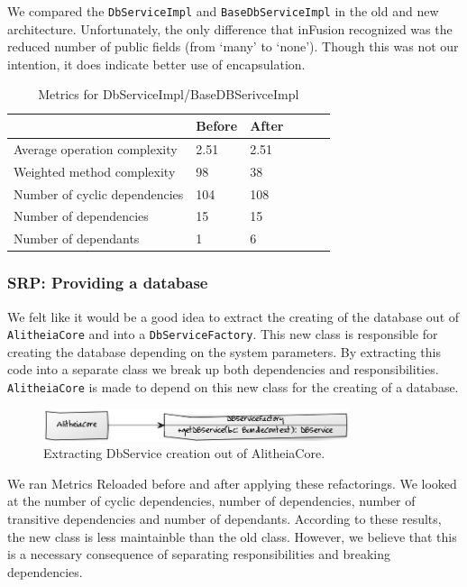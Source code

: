\documentclass{article}
\begin{document}
We compared the \verb|DbServiceImpl| and \verb|BaseDbServiceImpl| in the old and new architecture. Unfortunately, the only difference that inFusion recognized was the reduced number of public fields (from `many' to `none'). Though this was not our intention, it does indicate better use of encapsulation.


\begin{table}[h]
	\centering
    \begin{tabular}{l|llll}
    ~                                 & Before & After & ~ & ~ \\ \hline
    Average operation complexity      & 2.51 & 2.51 \\
    Weighted method complexity        & 98   & 38 \\
    Number of cyclic dependencies     & 104  & 108 \\
    Number of dependencies            & 15   & 15  \\
    Number of dependants              & 1    & 6   \\
    \end{tabular}
    \caption{Metrics for DbServiceImpl/BaseDBSerivceImpl}
\end{table}

\subsubsection{SRP: Providing a database}
We felt like it would be a good idea to extract the creating of the database out of \verb|AlitheiaCore| and into a \verb|DbServiceFactory|. This new class is responsible for creating the database depending on the system parameters. By extracting this code into a separate class we break up both dependencies and responsibilities. \verb|AlitheiaCore| is made to depend on this new class for the creating of a database.

\begin{figure}[h]
    \centering
    \includegraphics[width=0.8\textwidth]{dbfactory}
    \caption{Extracting DbService creation out of AlitheiaCore.}
    \label{fig:dbfactory}
\end{figure}

We ran Metrics Reloaded before and after applying these refactorings. We looked at the number of cyclic dependencies, number of dependencies, number of transitive dependencies and number of dependants. According to these results, the new class is less maintainble than the old class. However, we believe that this is a necessary consequence of separating responsibilities and breaking dependencies.
\end{document}
